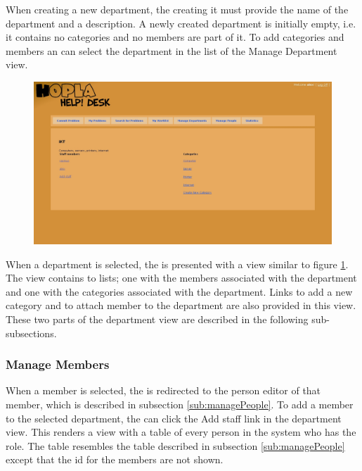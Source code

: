 When creating a new department, the \admin[] creating it must provide the name of the department and a description.
A newly created department is initially empty, i.e. it contains no categories and no \astaff[] members are part of it.
To add categories and \astaff[] members an \admin[] can select the department in the list of the Manage Department view.

\begin{figure}[htb]
	\centering
		\includegraphics[width=1.00\textwidth, clip=true, trim=2.9cm 6cm 10cm 8cm]{input/implementation/program_presentation/department.png}
	\label{fig:department}
\end{figure}

When a department is selected, the \admin[] is presented with a view similar to figure \ref{fig:department}.
The view contains to lists; one with the \astaff[] members associated with the department and one with the categories associated with the department.
Links to add a new category and to attach \astaff[] member to the department are also provided in this view.
These two parts of the department view are described in the following sub-subsections.

\subsubsection{Manage \astaff[c] Members}
When a \astaff[] member is selected, the \admin[] is redirected to the person editor of that \astaff[] member, which is described in subsection \ref{sub:managePeople}.
To add a \astaff[] member to the selected department, the \admin[] can click the Add staff link in the department view.
This renders a view with a table of every person in the system who has the \astaff[] role.
The table resembles the table described in subsection \ref{sub:managePeople} except that the id for the \astaff[] members are not shown.

